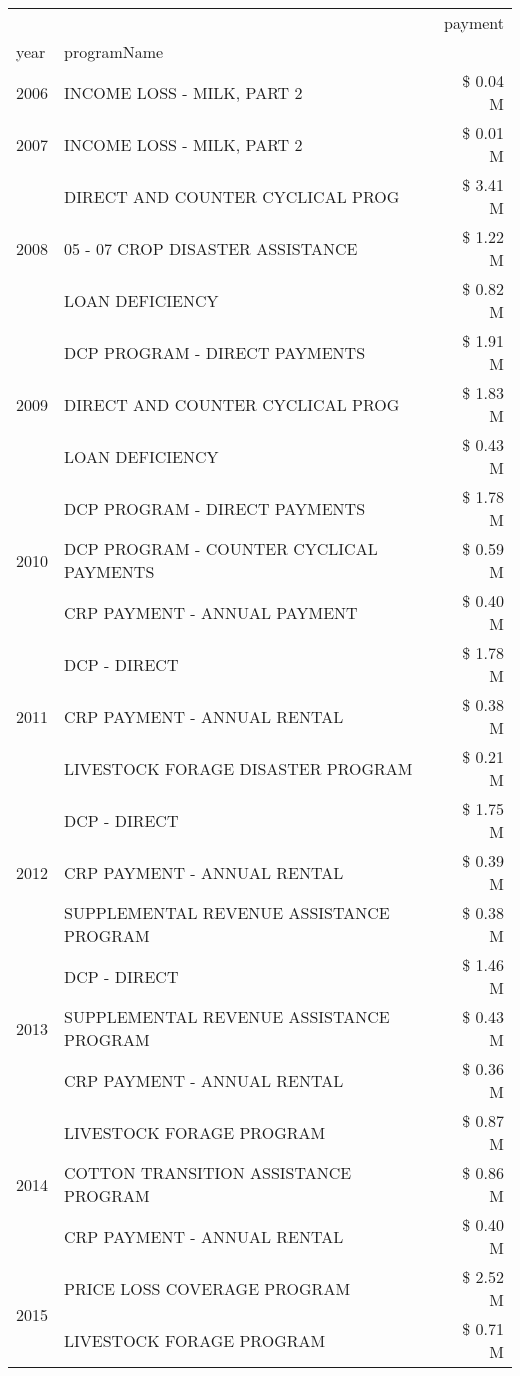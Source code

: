 \begin{tabular}{llr}
\toprule
 &  & payment \\
year & programName &  \\
\midrule
2006 & INCOME LOSS - MILK, PART 2 & \$ 0.04 M \\
\cline{1-3}
2007 & INCOME LOSS - MILK, PART 2 & \$ 0.01 M \\
\cline{1-3}
\multirow[t]{3}{*}{2008} & DIRECT AND COUNTER CYCLICAL PROG & \$ 3.41 M \\
 & 05 - 07 CROP DISASTER ASSISTANCE & \$ 1.22 M \\
 & LOAN DEFICIENCY & \$ 0.82 M \\
\cline{1-3}
\multirow[t]{3}{*}{2009} & DCP PROGRAM - DIRECT PAYMENTS & \$ 1.91 M \\
 & DIRECT AND COUNTER CYCLICAL PROG & \$ 1.83 M \\
 & LOAN DEFICIENCY & \$ 0.43 M \\
\cline{1-3}
\multirow[t]{3}{*}{2010} & DCP PROGRAM - DIRECT PAYMENTS & \$ 1.78 M \\
 & DCP PROGRAM - COUNTER CYCLICAL PAYMENTS & \$ 0.59 M \\
 & CRP PAYMENT - ANNUAL PAYMENT & \$ 0.40 M \\
\cline{1-3}
\multirow[t]{3}{*}{2011} & DCP - DIRECT & \$ 1.78 M \\
 & CRP PAYMENT - ANNUAL RENTAL & \$ 0.38 M \\
 & LIVESTOCK FORAGE DISASTER PROGRAM & \$ 0.21 M \\
\cline{1-3}
\multirow[t]{3}{*}{2012} & DCP - DIRECT & \$ 1.75 M \\
 & CRP PAYMENT - ANNUAL RENTAL & \$ 0.39 M \\
 & SUPPLEMENTAL REVENUE ASSISTANCE PROGRAM & \$ 0.38 M \\
\cline{1-3}
\multirow[t]{3}{*}{2013} & DCP - DIRECT & \$ 1.46 M \\
 & SUPPLEMENTAL REVENUE ASSISTANCE PROGRAM & \$ 0.43 M \\
 & CRP PAYMENT - ANNUAL RENTAL & \$ 0.36 M \\
\cline{1-3}
\multirow[t]{3}{*}{2014} & LIVESTOCK FORAGE PROGRAM & \$ 0.87 M \\
 & COTTON TRANSITION ASSISTANCE PROGRAM & \$ 0.86 M \\
 & CRP PAYMENT - ANNUAL RENTAL & \$ 0.40 M \\
\cline{1-3}
\multirow[t]{3}{*}{2015} & PRICE LOSS COVERAGE PROGRAM & \$ 2.52 M \\
 & LIVESTOCK FORAGE PROGRAM & \$ 0.71 M \\

\end{tabular}
